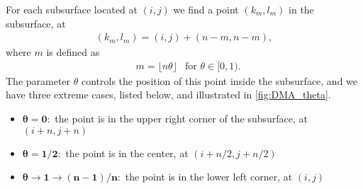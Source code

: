 For each subsurface located at $(i,j)$ we find a point $(k_m, l_m)$ in the subsurface, at
\begin{align*}
    (k_m, l_m) = (i,j) + (n-m, n-m), %
\end{align*}
where $m$ is defined as
\begin{align*}
    &m = \lfloor n\theta \rfloor &\text{for } \theta \in [0,1).
\end{align*}
The parameter $\theta$ controls the position of this point inside the subsurface, and we have three extreme cases, listed below, and illustrated in \cref{fig:DMA_theta}.%
\begin{itemize}[label={}]
    \item $\bm{\theta = 0:}$ the point is in the upper right corner of the subsurface, at $(i+n,j+n)$
    \item $\bm{\theta = 1/2:}$ the point is in the center, at $(i+n/2, j+n/2)$
    \item $\bm{\theta \rightarrow 1 \rightarrow (n-1)/n:}$ the point is in the lower left corner, at $(i,j)$
\end{itemize}
%
